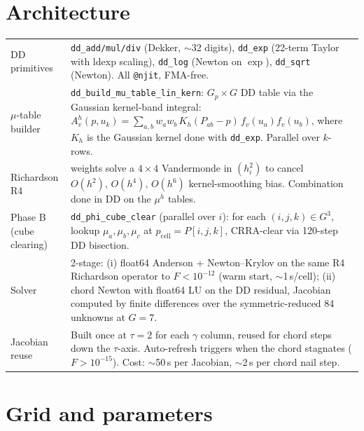 \documentclass[11pt]{article}
\begin{document}
\section{Architecture}

\begin{tabularx}{\linewidth}{lX}
\toprule
DD primitives & \texttt{dd\_add/mul/div} (Dekker, $\sim$32 digits),
                \texttt{dd\_exp} (22-term Taylor with ldexp scaling),
                \texttt{dd\_log} (Newton on $\exp$),
                \texttt{dd\_sqrt} (Newton). All \texttt{@njit}, FMA-free. \\
$\mu$-table builder & \texttt{dd\_build\_mu\_table\_lin\_kern}:
                $G_p{\times}G$ DD table via the Gaussian kernel-band integral:
                $A_v^h(p, u_k) = \sum_{a,b} w_a w_b\, K_h(P_{ab}-p)\, f_v(u_a) f_v(u_b)$,
                where $K_h$ is the Gaussian kernel done with \texttt{dd\_exp}.
                Parallel over $k$-rows. \\
Richardson R4 & weights solve a $4\times 4$ Vandermonde in $(h_i^2)$ to cancel
                $O(h^2),\,O(h^4),\,O(h^6)$ kernel-smoothing bias. Combination
                done in DD on the $\mu^h$ tables. \\
Phase B (cube clearing) & \texttt{dd\_phi\_cube\_clear} (parallel over $i$):
                for each $(i,j,k) \in G^3$, lookup $\mu_a, \mu_b, \mu_c$ at
                $p_\mathrm{cell} = P[i,j,k]$, CRRA-clear via 120-step DD
                bisection. \\
Solver & 2-stage:
                (i) float64 Anderson + Newton--Krylov on the same R4
                Richardson operator to $F < 10^{-12}$ (warm start,
                $\sim$1\,s/cell);
                (ii) chord Newton with float64 LU on the DD residual,
                Jacobian computed by finite differences over the
                symmetric-reduced 84 unknowns at $G{=}7$. \\
Jacobian reuse & Built once at $\tau{=}2$ for each $\gamma$ column,
                reused for chord steps down the $\tau$-axis. Auto-refresh
                triggers when the chord stagnates ($F > 10^{-15}$).
                Cost: $\sim$50\,s per Jacobian, $\sim$2\,s per chord nail step. \\
\bottomrule
\end{tabularx}

\section{Grid and parameters}
\end{document}
